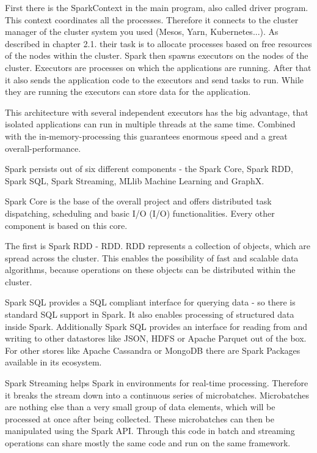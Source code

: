First there is the SparkContext in the main program, also called driver program. This context coordinates all the processes. Therefore it connects to the cluster manager of the cluster system you used (Mesos, Yarn, Kubernetes...). As described in chapter 2.1. their task is to allocate processes based on free resources of the nodes within the cluster. Spark then spawns executors on the nodes of the cluster. Executors are processes on which the applications are running. After that it also sends the application code to the executors and send tasks to run. While they are running the executors can store data for the application.

This architecture with several independent executors has the big advantage, that isolated applications can run in multiple threads at the same time. Combined with the in-memory-processing this guarantees enormous speed and a great overall-performance.

Spark persists out of six different components - the Spark Core, Spark \acs{RDD}, Spark SQL, Spark Streaming, MLlib Machine Learning and GraphX.

Spark Core is the base of the overall project and offers distributed task dispatching, scheduling and basic \acs{I/O} (\acl{I/O}) functionalities. Every other component is based on this core.

The first is Spark RDD - \acl{RDD}. RDD represents a collection of objects, which are spread across the cluster. This enables the possibility of fast and scalable data algorithms, because operations on these objects can be distributed within the cluster.

Spark SQL provides a SQL compliant interface for querying data - so there is standard SQL support in Spark. It also enables processing of structured data inside Spark. Additionally Spark SQL provides an interface for reading from and writing to other datastores like JSON, HDFS or Apache Parquet out of the box. For other stores like Apache Cassandra or MongoDB there are Spark Packages available in its ecosystem.

Spark Streaming helps Spark in environments for real-time processing. Therefore it breaks the stream down into a continuous series of microbatches. Microbatches are nothing else than a very small group of data elements, which will be processed at once after being collected. These microbatches can then be manipulated using the Spark API. Through this code in batch and streaming operations can share mostly the same code and run on the same framework. 


